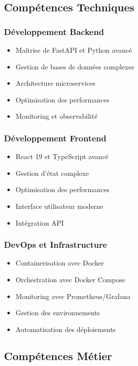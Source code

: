 \documentclass[12pt,a4paper]{article}
\begin{document}
\subsection{Compétences Techniques}

\subsubsection{Développement Backend}
\begin{itemize}
    \item Maîtrise de FastAPI et Python avancé
    \item Gestion de bases de données complexes
    \item Architecture microservices
    \item Optimisation des performances
    \item Monitoring et observabilité
\end{itemize}

\subsubsection{Développement Frontend}
\begin{itemize}
    \item React 19 et TypeScript avancé
    \item Gestion d'état complexe
    \item Optimisation des performances
    \item Interface utilisateur moderne
    \item Intégration API
\end{itemize}

\subsubsection{DevOps et Infrastructure}
\begin{itemize}
    \item Containerisation avec Docker
    \item Orchestration avec Docker Compose
    \item Monitoring avec Prometheus/Grafana
    \item Gestion des environnements
    \item Automatisation des déploiements
\end{itemize}

\subsection{Compétences Métier}
\end{document}
